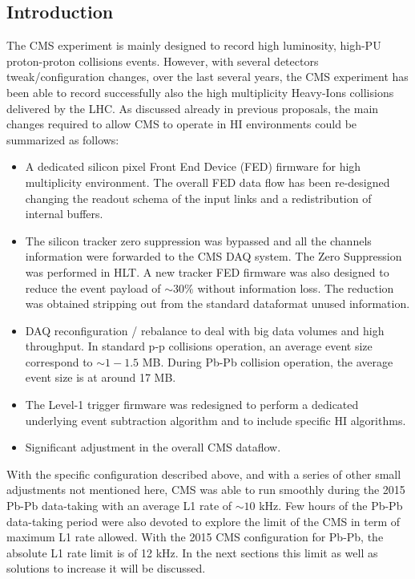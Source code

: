 \subsection{Introduction\label{subsec:HWintro}}
The CMS experiment is mainly designed to record high luminosity, high-PU proton-proton collisions events.  However, with several detectors tweak/configuration changes, over the last several years, the CMS experiment has been able to record successfully also the high multiplicity Heavy-Ions collisions delivered by the LHC. As discussed already in previous
proposals, the main changes required to allow CMS to operate in HI environments could be summarized as follows:

\begin{itemize}
\item A dedicated silicon pixel Front End Device (FED) firmware for high multiplicity environment. The overall FED data flow has been re-designed changing the readout schema of the input links and a redistribution of internal buffers.
 
\item The silicon tracker zero suppression was bypassed and all the channels information were forwarded to the CMS DAQ system. The Zero Suppression was performed in HLT. A new tracker FED firmware was also designed to reduce the event payload of $\sim 30 \%$ without information loss. The reduction was obtained stripping out from the standard dataformat unused information.  

\item DAQ reconfiguration / rebalance to deal with big data volumes and high throughput. In standard p-p collisions operation, an average event size correspond to $\sim 1-1.5$ MB. During Pb-Pb collision operation, the average event size is at around 17 MB. 

\item The Level-1 trigger firmware was redesigned to perform a dedicated underlying event subtraction algorithm and to include specific HI algorithms.

\item Significant adjustment in the overall CMS dataflow.
\end{itemize}


With the specific configuration described above, and with a series of other small adjustments not mentioned here, CMS was able to run smoothly during the 2015 Pb-Pb data-taking with an average L1 rate of $\sim 10$ kHz. Few hours of the Pb-Pb data-taking
period were also devoted to explore the limit of the CMS in term of maximum L1 rate allowed.  With the 2015 CMS configuration for Pb-Pb, the absolute L1 rate limit is of 12 kHz. In the next sections this limit as well as solutions to increase it will be discussed. 

